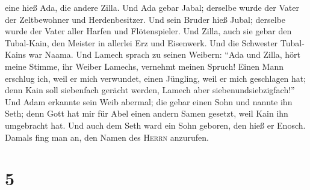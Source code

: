 eine hieß Ada, die andere Zilla.  Und Ada gebar Jabal;
derselbe wurde der Vater der Zeltbewohner und Herdenbesitzer.
 Und sein Bruder hieß Jubal; derselbe wurde der Vater
aller Harfen und Flötenspieler.  Und Zilla, auch sie
gebar den Tubal-Kain, den Meister in allerlei Erz und Eisenwerk. Und die
Schwester Tubal-Kains war Naama.  Und Lamech sprach zu
seinen Weibern: ``Ada und Zilla, hört meine Stimme, ihr Weiber Lamechs,
vernehmt meinen Spruch! Einen Mann erschlug ich, weil er mich verwundet,
einen Jüngling, weil er mich geschlagen hat;  denn Kain
soll siebenfach gerächt werden, Lamech aber siebenundsiebzigfach!''
 Und Adam erkannte sein Weib abermal; die gebar einen
Sohn und nannte ihn Seth; denn Gott hat mir für Abel einen andern Samen
gesetzt, weil Kain ihn umgebracht hat.  Und auch dem Seth
ward ein Sohn geboren, den hieß er Enosch. Damals fing man an, den Namen
des \textsc{Herrn} anzurufen.

\hypertarget{section-4}{%
\section{5}\label{section-4}}

